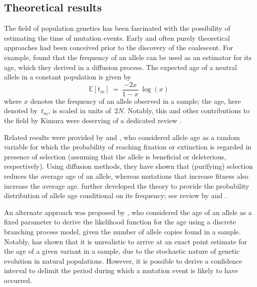 %
\subsection{Theoretical results}
%

The field of population genetics has been fascinated with the possibility of estimating the time of mutation events.
Early and often purely theoretical approaches had been conceived prior to the discovery of the coalescent.
For example, \citet{Kimura:1973ug} found that the frequency of an allele can be used as an estimator for its age, which they derived in a diffusion process.
The expected age of a neutral allele in a constant population is given by
\begin{equation}\label{eq:intro_kimura_ohta}
	\mathbb{E}\left[t_m\right]~=~\frac{-2x}{1-x}~\log(x)
\end{equation}
where $x$ denotes the frequency of an allele observed in a sample; the age, here denoted by~$t_m$, is scaled in units of~$2N$.
Notably, this and other contributions to the field by Kimura were deserving of a dedicated review \citep{Watterson:1996wr}.

Related results were provided by \citet{Maruyama:1974ba} and \citet{Li:1975vj}, who considered allele age as a random variable for which the probability of reaching fixation or extinction is regarded in presence of selection (\ie assuming that the allele is beneficial or deleterious, respectively).
Using diffusion methods, they have shown that (purifying) selection reduces the average age of an allele, whereas mutations that increase fitness also increase the average age.
 further developed the theory to provide the probability distribution of allele age conditional on its frequency; see review by \citet{Slatkin:2000bi} and \citet{Slatkin:2000us}.

An alternate approach was proposed by \citet{Thompson:1976uf}, who considered the age of an allele as a fixed parameter to derive the likelihood function for the age using a discrete branching process model, given the number of allele copies found in a sample.
Notably, \citet{Thompson:1976uf} has shown that it is unrealistic to arrive at an exact point estimate for the age of a given variant in a sample, due to the stochastic nature of genetic evolution in natural populations.
However, it is possible to derive a confidence interval to delimit the period during which a mutation event is likely to have occurred.

